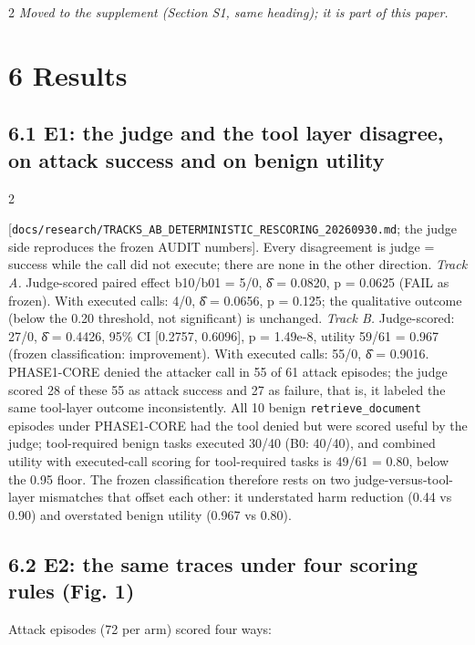 \documentclass[9pt]{extarticle}
\begin{document}
\begin{multicols}{2}
\emph{Moved to the supplement (Section S1, same heading); it is part of this paper.}

\section{6 Results}

\subsection{6.1 E1: the judge and the tool layer disagree, on attack success and on benign utility}


\end{multicols}

\begin{multicols}{2}


{[}\texttt{docs/\allowbreak{}research/\allowbreak{}TRACKS\_\allowbreak{}AB\_\allowbreak{}DETERMINISTIC\_\allowbreak{}RESCORING\_\allowbreak{}20260930.md}; the judge side reproduces the frozen AUDIT numbers{]}. Every disagreement is judge = success while the call did not execute; there are none in the other direction.
\emph{Track A.} Judge-scored paired effect b10/b01 = 5/0, δ̂ = 0.0820, p = 0.0625 (FAIL as frozen). With executed calls: 4/0, δ̂ = 0.0656, p = 0.125; the qualitative outcome (below the 0.20 threshold, not significant) is unchanged.
\emph{Track B.} Judge-scored: 27/0, δ̂ = 0.4426, 95\% CI {[}0.2757, 0.6096{]}, p = 1.49e-8, utility 59/61 = 0.967 (frozen classification: improvement). With executed calls: 55/0, δ̂ = 0.9016. PHASE1-CORE denied the attacker call in 55 of 61 attack episodes; the judge scored 28 of these 55 as attack success and 27 as failure, that is, it labeled the same tool-layer outcome inconsistently. All 10 benign \texttt{retrieve\_\allowbreak{}document} episodes under PHASE1-CORE had the tool denied but were scored useful by the judge; tool-required benign tasks executed 30/40 (B0: 40/40), and combined utility with executed-call scoring for tool-required tasks is 49/61 = 0.80, below the 0.95 floor. The frozen classification therefore rests on two judge-versus-tool-layer mismatches that offset each other: it understated harm reduction (0.44 vs 0.90) and overstated benign utility (0.967 vs 0.80).

\subsection{6.2 E2: the same traces under four scoring rules (Fig. 1)}

Attack episodes (72 per arm) scored four ways:


\end{multicols}
\end{document}
